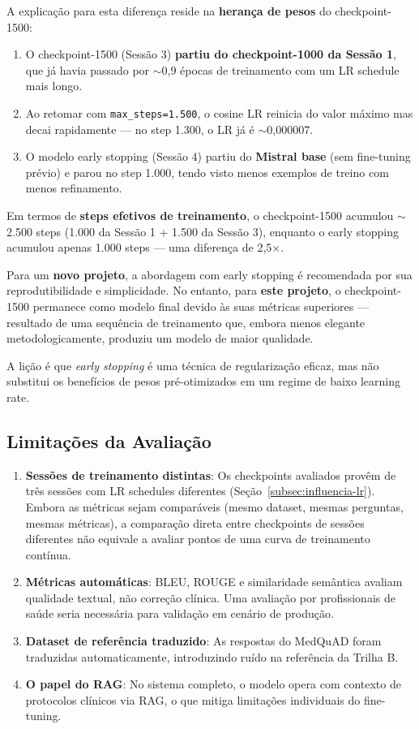 A explicação para esta diferença reside na \textbf{herança de pesos} do checkpoint-1500:

\begin{enumerate}
    \item O checkpoint-1500 (Sessão 3) \textbf{partiu do checkpoint-1000 da Sessão 1}, que já havia passado por $\sim$0,9 épocas de treinamento com um LR schedule mais longo.
    \item Ao retomar com \texttt{max\_steps=1.500}, o cosine LR reinicia do valor máximo mas decai rapidamente --- no step 1.300, o LR já é $\sim$0,000007.
    \item O modelo early stopping (Sessão 4) partiu do \textbf{Mistral base} (sem fine-tuning prévio) e parou no step 1.000, tendo visto menos exemplos de treino com menos refinamento.
\end{enumerate}

Em termos de \textbf{steps efetivos de treinamento}, o checkpoint-1500 acumulou $\sim$2.500 steps (1.000 da Sessão 1 + 1.500 da Sessão 3), enquanto o early stopping acumulou apenas 1.000 steps --- uma diferença de 2,5$\times$.

\begin{infobox}
Para um \textbf{novo projeto}, a abordagem com early stopping é recomendada por sua reprodutibilidade e simplicidade. No entanto, para \textbf{este projeto}, o checkpoint-1500 permanece como modelo final devido às suas métricas superiores --- resultado de uma sequência de treinamento que, embora menos elegante metodologicamente, produziu um modelo de maior qualidade.

A lição é que \textit{early stopping} é uma técnica de regularização eficaz, mas não substitui os benefícios de pesos pré-otimizados em um regime de baixo learning rate.
\end{infobox}

\subsection{Limitações da Avaliação}

\begin{enumerate}
    \item \textbf{Sessões de treinamento distintas}: Os checkpoints avaliados provêm de três sessões com LR schedules diferentes (Seção~\ref{subsec:influencia-lr}). Embora as métricas sejam comparáveis (mesmo dataset, mesmas perguntas, mesmas métricas), a comparação direta entre checkpoints de sessões diferentes não equivale a avaliar pontos de uma curva de treinamento contínua.
    \item \textbf{Métricas automáticas}: BLEU, ROUGE e similaridade semântica avaliam qualidade textual, não correção clínica. Uma avaliação por profissionais de saúde seria necessária para validação em cenário de produção.
    \item \textbf{Dataset de referência traduzido}: As respostas do MedQuAD foram traduzidas automaticamente, introduzindo ruído na referência da Trilha B.
    \item \textbf{O papel do RAG}: No sistema completo, o modelo opera com contexto de protocolos clínicos via RAG, o que mitiga limitações individuais do fine-tuning.
\end{enumerate}
